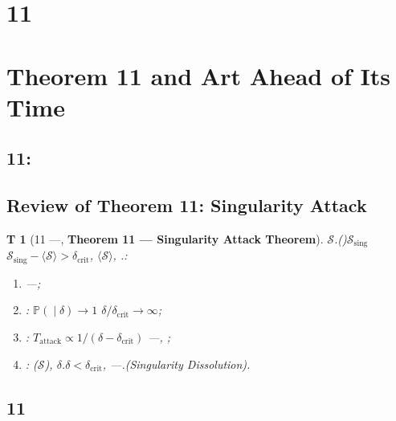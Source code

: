 \documentclass[12pt,a4paper]{article}
\newtheorem{theorem}Theorem[section]
\theoremstyle{remark}
\newcommand{\Pbb}{\mathbb{P}}
\newcommand{\Sstates}{\mathcal{S}}
\newcommand{\avg}[1]{\langle #1 \rangle}
\begin{document}
\section{11}
\section{Theorem 11 and Art Ahead of Its Time}
\subsection{11:}
\subsection{Review of Theorem 11: Singularity Attack}
\begin{theorem}[11 ---, \textbf{Theorem 11 --- Singularity Attack Theorem}]
\label{thm:singularity_attack}
$\Sstates$.()$\Sstates_{\text{sing}}$$\Sstates_{\text{sing}} - \avg{\Sstates} > \delta_{\text{crit}}$, $\avg{\Sstates}$, .: 
\begin{enumerate}[label=(\roman*)]
 \item ---; 
 \item : $\Pbb(\text{} \mid \delta) \to 1$ $\delta / \delta_{\text{crit}} \to \infty$; 
 \item : $T_{\text{attack}} \propto 1 / (\delta - \delta_{\text{crit}})$ ---, ; 
 \item : ($\Sstates$), $\delta$.$\delta < \delta_{\text{crit}}$, ---.(Singularity Dissolution).
\end{enumerate}
\end{theorem}
\subsection{11}
\end{document}
